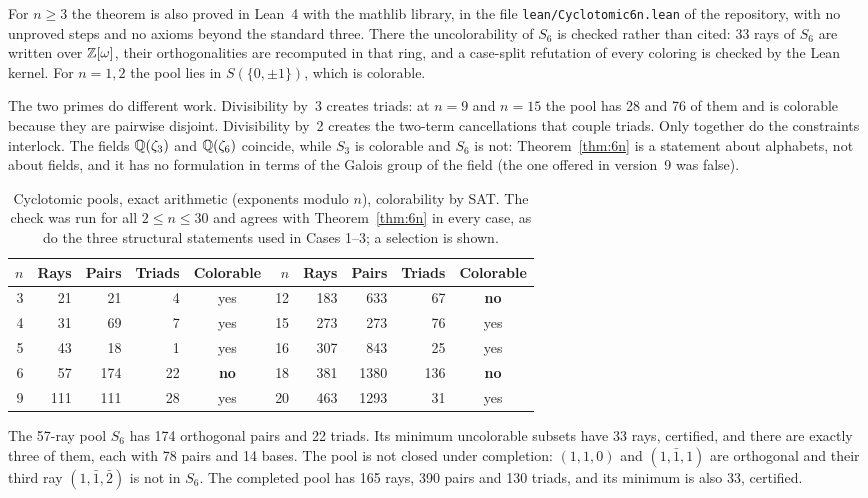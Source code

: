 For $n\ge3$ the theorem is also proved in Lean~4 with the mathlib library, in the file
\texttt{lean/Cyclotomic6n.lean} of the repository, with no unproved steps and no axioms
beyond the standard three.  There the uncolorability of $S_6$ is checked rather than cited: 33 rays of $S_6$ are
written over $\mathbb{Z}[\omega]$, their orthogonalities are recomputed in that ring, and a case-split
refutation of every coloring is checked by the Lean kernel.  For $n=1,2$ the pool lies in
$S(\{0,\pm1\})$, which is colorable.

The two primes do different work.  Divisibility by~3 creates triads: at $n=9$ and $n=15$ the pool
has 28 and 76 of them and is colorable because they are pairwise disjoint.  Divisibility by~2
creates the two-term cancellations that couple triads.  Only together do the constraints
interlock.  The fields $\mathbb{Q}(\zeta_3)$ and $\mathbb{Q}(\zeta_6)$ coincide, while $S_3$ is colorable and
$S_6$ is not: Theorem~\ref{thm:6n} is a statement about alphabets, not about fields, and it has
no formulation in terms of the Galois group of the field (the one offered in version~9 was
false).

\begin{table}[t]
\centering
\caption{Cyclotomic pools, exact arithmetic (exponents modulo $n$), colorability by SAT.  The
check was run for all $2\le n\le30$ and agrees with Theorem~\ref{thm:6n} in every case, as do the
three structural statements used in Cases 1--3; a selection is shown.}
\label{tab:cyc}
\begin{tabular}{rrrrc@{\qquad\qquad}rrrrc}
\toprule
$n$ & Rays & Pairs & Triads & Colorable & $n$ & Rays & Pairs & Triads & Colorable\\
\midrule
3 & 21 & 21 & 4 & yes & 12 & 183 & 633 & 67 & \textbf{no}\\
4 & 31 & 69 & 7 & yes & 15 & 273 & 273 & 76 & yes\\
5 & 43 & 18 & 1 & yes & 16 & 307 & 843 & 25 & yes\\
6 & 57 & 174 & 22 & \textbf{no} & 18 & 381 & 1380 & 136 & \textbf{no}\\
9 & 111 & 111 & 28 & yes & 20 & 463 & 1293 & 31 & yes\\
\bottomrule
\end{tabular}
\end{table}

\begin{fact}\label{fact:eisenstein}
The 57-ray pool $S_6$ has 174 orthogonal pairs and 22 triads.  Its minimum uncolorable subsets
have 33 rays, certified, and there are exactly three of them, each with 78 pairs and 14 bases.
The pool is not closed under completion: $(1,1,0)$ and $(1,\bar1,1)$ are orthogonal and their
third ray $(1,\bar1,\bar2)$ is not in $S_6$.  The completed pool has 165 rays, 390 pairs and 130
triads, and its minimum is also 33, certified.
\end{fact}

